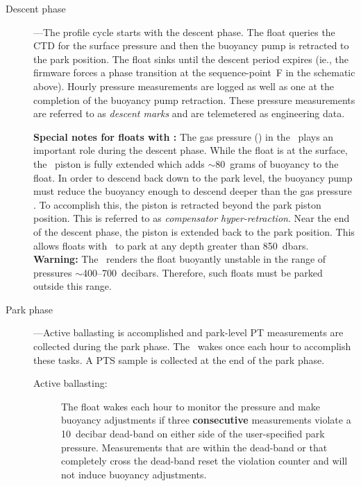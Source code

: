 \begin{description}

\item[Descent phase\label{DescentPhase}]---The profile cycle starts with
  the descent phase.  The float queries the CTD for the surface pressure and
  then the buoyancy pump is retracted to the park position.  The float sinks
  until the descent period expires (ie., the firmware forces a phase
  transition at the sequence-point~F in the schematic above).  Hourly
  pressure measurements are logged as well as one at the completion of the
  buoyancy pump retraction.  These pressure measurements are referred to as
  \emph{descent marks} and are telemetered as engineering data.
  
  \textbf{Special notes for floats with \NComp:\label{DescentPhaseNComp}}
  The gas pressure (\Pn) in the \NComp\ plays an important role during the
  descent phase.  While the float is at the surface, the \NComp\ piston is
  fully extended which adds $\sim$80~grams of buoyancy to the float.  In
  order to descend back down to the park level, the buoyancy pump must
  reduce the buoyancy enough to descend deeper than the gas pressure \Pn.
  To accomplish this, the piston is retracted beyond the park piston
  position.  This is referred to as \emph{compensator hyper-retraction}.
  Near the end of the descent phase, the piston is extended back to the park
  position.  This allows floats with \NComp\ to park at any depth greater
  than 850~dbars.  \textbf{Warning:} The \NComp\ renders the float buoyantly
  unstable in the range of pressures $\sim$400--700~decibars.  Therefore,
  such floats must be parked outside this range.

\item[Park phase\label{ParkPhase}]---Active ballasting is accomplished and
  park-level PT measurements are collected during the park phase.  The \apf\
  wakes once each hour to accomplish these tasks.  A PTS sample is collected
  at the end of the park phase.
  
  \begin{description}
  \item[Active ballasting:] The float wakes each hour to monitor the
    pressure and make buoyancy adjustments if three \textbf{consecutive}
    measurements violate a 10~decibar dead-band on either side of the
    user-specified park pressure.  Measurements that are within the
    dead-band or that completely cross the dead-band reset the violation
    counter and will not induce buoyancy adjustments.
    

\end{description}
\end{description}
